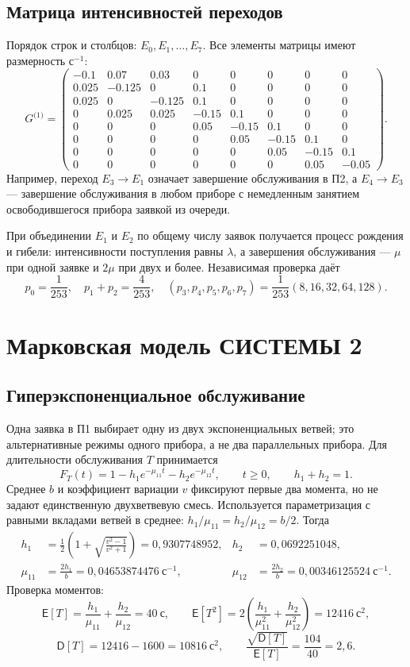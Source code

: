 \documentclass[11pt,a4paper]{article}
\newcommand{\sI}{\text{(1)}}
\newcommand{\secs}{\text{с}}
\begin{document}
\subsection{Матрица интенсивностей переходов}
Порядок строк и столбцов: $E_0,E_1,\ldots,E_7$. Все элементы матрицы имеют размерность $\secs^{-1}$:
\begin{equation}
G^{\sI}=\begin{pmatrix}
-0.1&0.07&0.03&0&0&0&0&0\\
0.025&-0.125&0&0.1&0&0&0&0\\
0.025&0&-0.125&0.1&0&0&0&0\\
0&0.025&0.025&-0.15&0.1&0&0&0\\
0&0&0&0.05&-0.15&0.1&0&0\\
0&0&0&0&0.05&-0.15&0.1&0\\
0&0&0&0&0&0.05&-0.15&0.1\\
0&0&0&0&0&0&0.05&-0.05
\end{pmatrix}.
\end{equation}
Например, переход $E_3\to E_1$ означает завершение обслуживания в П2, а $E_4\to E_3$ --- завершение обслуживания в любом приборе с немедленным занятием освободившегося прибора заявкой из очереди.

При объединении $E_1$ и $E_2$ по общему числу заявок получается процесс рождения и гибели: интенсивности поступления равны $\lambda$, а завершения обслуживания --- $\mu$ при одной заявке и $2\mu$ при двух и более. Независимая проверка даёт
\[
p_0=\frac1{253},\quad p_1+p_2=\frac4{253},\quad
(p_3,p_4,p_5,p_6,p_7)=\frac1{253}(8,16,32,64,128).
\]

\newpage
\section{Марковская модель СИСТЕМЫ 2}
\subsection{Гиперэкспоненциальное обслуживание}
Одна заявка в П1 выбирает одну из двух экспоненциальных ветвей; это альтернативные режимы одного прибора, а не два параллельных прибора. Для длительности обслуживания $T$ принимается
\begin{equation}
F_T(t)=1-h_1e^{-\mu_{11}t}-h_2e^{-\mu_{12}t},\qquad t\ge0,\qquad h_1+h_2=1.
\end{equation}
Среднее $b$ и коэффициент вариации $v$ фиксируют первые два момента, но не задают единственную двухветвевую смесь. Используется параметризация с равными вкладами ветвей в среднее: $h_1/\mu_{11}=h_2/\mu_{12}=b/2$. Тогда
\begin{align}
h_1&=\frac12\left(1+\sqrt{\frac{v^2-1}{v^2+1}}\right)=0{,}9307748952,
&h_2&=0{,}0692251048,\\
\mu_{11}&=\frac{2h_1}{b}=0{,}04653874476\ \secs^{-1},
&\mu_{12}&=\frac{2h_2}{b}=0{,}00346125524\ \secs^{-1}.
\end{align}
Проверка моментов:
\[
\mathsf E[T]=\frac{h_1}{\mu_{11}}+\frac{h_2}{\mu_{12}}=40\ \secs,\qquad
\mathsf E[T^2]=2\left(\frac{h_1}{\mu_{11}^2}+\frac{h_2}{\mu_{12}^2}\right)=12416\ \secs^2,
\]
\[
\mathsf D[T]=12416-1600=10816\ \secs^2,\qquad
\frac{\sqrt{\mathsf D[T]}}{\mathsf E[T]}=\frac{104}{40}=2{,}6.
\]
\end{document}
